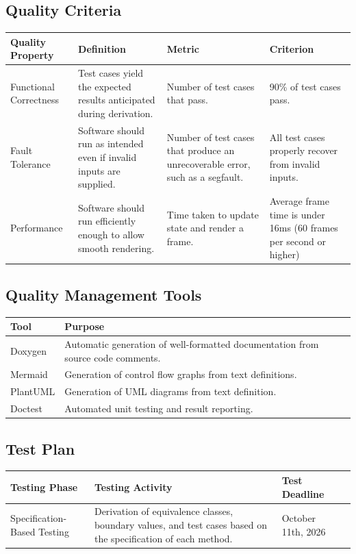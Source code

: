 \documentclass[11pt]{article}
\begin{document}
\subsection{Quality Criteria}
\label{sec:org877d18d}
\begin{center}
\begin{tabularx}{\textwidth}{lXXX}
\hline
\textbf{Quality Property} & \textbf{Definition} & \textbf{Metric} & \textbf{Criterion}\\
\hline
Functional Correctness & Test cases yield the expected results anticipated during derivation. & Number of test cases that pass. & 90\% of test cases pass.\\
\hline
Fault Tolerance & Software should run as intended even if invalid inputs are supplied. & Number of test cases that produce an unrecoverable error, such as a segfault. & All test cases properly recover from invalid inputs.\\
\hline
Performance & Software should run efficiently enough to allow smooth rendering. & Time taken to update state and render a frame. & Average frame time is under 16ms (60 frames per second or higher)\\
\hline
\end{tabularx}
\end{center}
\subsection{Quality Management Tools}
\label{sec:orgc256bd9}
\begin{center}
\begin{tabularx}{\textwidth}{lXXX}
\hline
\textbf{Tool} & \textbf{Purpose}\\
\hline
Doxygen & Automatic generation of well-formatted documentation from source code comments.\\
\hline
Mermaid & Generation of control flow graphs from text definitions.\\
\hline
PlantUML & Generation of UML diagrams from text definition.\\
\hline
Doctest & Automated unit testing and result reporting.\\
\hline
\end{tabularx}
\end{center}
\subsection{Test Plan}
\label{sec:orgbd31e63}
\begin{center}
\begin{tabularx}{\textwidth}{lXXX}
\hline
\textbf{Testing Phase} & \textbf{Testing Activity} & \textbf{Test Deadline}\\
\hline
Specification-Based Testing & Derivation of equivalence classes, boundary values, and test cases based on the specification of each method. & October 11th, 2026\\
\hline
\end{tabularx}
\end{center}
\end{document}
